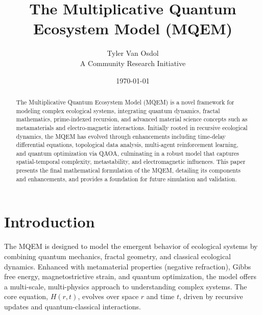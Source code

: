 \documentclass{article}
\theoremstyle{plain}
\begin{document}
\title{The Multiplicative Quantum Ecosystem Model (MQEM)}
\author{Tyler Van Osdol \\ A Community Research Initiative}
\date{\today}

\maketitle
\nolinenumbers

\begin{abstract}
The Multiplicative Quantum Ecosystem Model (MQEM) is a novel framework for modeling complex ecological systems, integrating quantum dynamics, fractal mathematics, prime-indexed recursion, and advanced material science concepts such as metamaterials and electro-magnetic interactions. Initially rooted in recursive ecological dynamics, the MQEM has evolved through enhancements including time-delay differential equations, topological data analysis, multi-agent reinforcement learning, and quantum optimization via QAOA, culminating in a robust model that captures spatial-temporal complexity, metastability, and electromagnetic influences. This paper presents the final mathematical formulation of the MQEM, detailing its components and enhancements, and provides a foundation for future simulation and validation.
\end{abstract}

\section{Introduction}
The MQEM is designed to model the emergent behavior of ecological systems by combining quantum mechanics, fractal geometry, and classical ecological dynamics. Enhanced with metamaterial properties (negative refraction), Gibbs free energy, magnetostrictive strain, and quantum optimization, the model offers a multi-scale, multi-physics approach to understanding complex systems. The core equation, \( H(r,t) \), evolves over space \( r \) and time \( t \), driven by recursive updates and quantum-classical interactions.
\end{document}
